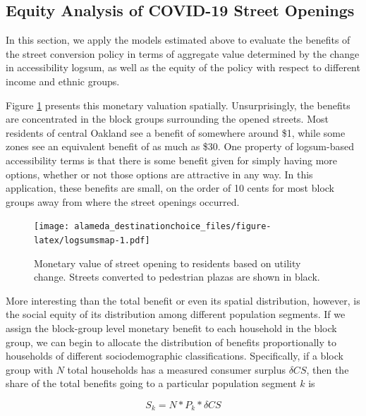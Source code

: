 \documentclass[3p, authoryear, review]{elsarticle} %
\begin{document}
\hypertarget{equity-analysis-of-covid-19-street-openings}{%
\subsection{Equity Analysis of COVID-19 Street Openings}\label{equity-analysis-of-covid-19-street-openings}}

In this section, we apply the models estimated above to evaluate the benefits of the street conversion policy in terms of aggregate value determined by the change in accessibility logsum, as well as the equity of the policy with respect to different income and ethnic groups.

Figure \ref{fig:logsumsmap} presents this monetary valuation spatially. Unsurprisingly, the benefits are concentrated in the block groups surrounding the opened streets. Most residents of central Oakland see a benefit of somewhere around \$1, while some zones see an equivalent benefit of as much as \$30. One property of logsum-based accessibility terms is that there is some benefit given for simply having more options, whether or not those options are attractive in any way. In this application, these benefits are small, on the order of 10 cents for most block groups away from where the street openings occurred.

\begin{figure}
\centering
\texttt{[image: alameda\_destinationchoice\_files/figure-latex/logsumsmap-1.pdf]}
\caption{\label{fig:logsumsmap}Monetary value of street opening to residents based on utility change. Streets converted to pedestrian plazas are shown in black.}
\end{figure}

More interesting than the total benefit or even its spatial distribution, however, is the social equity of its distribution among different population segments. If we assign the block-group level monetary benefit to each household in the block group, we can begin to allocate the distribution of benefits proportionally to households of different sociodemographic classifications. Specifically, if a block group with \(N\) total households has a measured consumer surplus \(\delta CS\), then the share of the total benefits going to a particular population segment \(k\) is

\begin{equation}
  S_k = N * P_k * \delta CS
  \label{eq:cs-alloc}
\end{equation}
\end{document}
